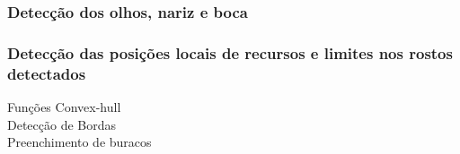 \documentclass{beamer}
\begin{document}
\begin{frame}
\frametitle{Detecção dos olhos, nariz e boca}

\begin{figure}[h]
\centering
{}
\end{figure}

\end{frame}

\begin{frame}
\frametitle{Detecção das posições locais de recursos e limites nos rostos detectados}

\begin{block}{Funções}
 Convex-hull\\
Detecção de Bordas\\
Preenchimento de buracos\\
\end{block}

\end{frame}
\end{document}
